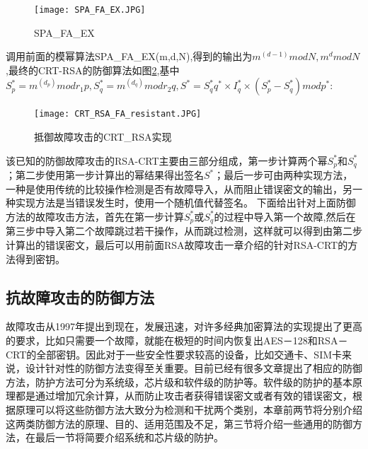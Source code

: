 \documentclass[a4paper,12pt]{article}
\begin{document}
\begin{CJK}{UTF8}{gkai}
\begin{figure}
\centering
\caption{SPA_FA_EX}
\texttt{[image: SPA\_FA\_EX.JPG]}
\label{SPA_FA_EX}
\end{figure}

调用前面的模幂算法SPA_FA_EX(m,d,N),得到的输出为$m^(d-1) mod N, m^d mod N$,最终的CRT-RSA的防御算法如图\ref{CRT_RSA_FA_resistant},基中$S_p^* = m^(d_p) mod r_1p, S_q^* = m^(d_q) mod r_2q, S^* = S_q^* q^* \times I_q^* \times (S_p^*-S_q^*) mod p^*$:

\begin{figure}
\centering
\caption{抵御故障攻击的CRT_RSA实现}
\texttt{[image: CRT\_RSA\_FA\_resistant.JPG]}
\label{CRT_RSA_FA_resistant}
\end{figure}

该已知的防御故障攻击的RSA-CRT主要由三部分组成，第一步计算两个幂$S_p^*$和$S_q^*$；第二步使用第一步计算出的幂结果得出签名$S^*$；最后一步可由两种实现方法，一种是使用传统的比较操作检测是否有故障导入，从而阻止错误密文的输出，另一种实现方法是当错误发生时，使用一个随机值代替签名。
下面给出针对上面防御方法的故障攻击方法，首先在第一步计算$S_p^*$或$S_q^*$的过程中导入第一个故障,然后在第三步中导入第二个故障跳过若干操作，从而跳过检测，这样就可以得到由第二步计算出的错误密文，最后可以用前面RSA故障攻击一章介绍的针对RSA-CRT的方法得到密钥。

\subsection{抗故障攻击的防御方法}
故障攻击从1997年提出到现在，发展迅速，对许多经典加密算法的实现提出了更高的要求，比如只需要一个故障，就能在极短的时间内恢复出AES－128和RSA－CRT的全部密钥。因此对于一些安全性要求较高的设备，比如交通卡、SIM卡来说，设计针对性的防御方法变得至关重要。目前已经有很多文章提出了相应的防御方法，防护方法可分为系统级，芯片级和软件级的防护等。软件级的防护的基本原理都是通过增加冗余计算，从而防止攻击者获得错误密文或者有效的错误密文，根据原理可以将这些防御方法大致分为检测和干扰两个类别，本章前两节将分别介绍这两类防御方法的原理、目的、适用范围及不足，第三节将介绍一些通用的防御方法，在最后一节将简要介绍系统和芯片级的防护。


\end{CJK}
\end{document}
